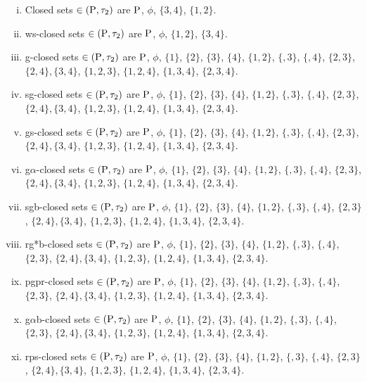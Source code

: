 \begin{exm}
\begin{enumerate}[(i)]
\item Closed sets $\in(\mathrm{P}, \tau_{2})$ are $\mathrm{P}$, $\phi$, $\{3, 4\}$, $\{1, 2\}$.
\item ws-closed sets $\in(\mathrm{P}, \tau_{2})$ are $\mathrm{P}$, $\phi$, $\{1, 2\}$, $\{3, 4\}$.
\item g-closed sets $\in(\mathrm{P}, \tau_{2})$ are $\mathrm{P}$, $\phi$, $\{1\}$, $\{2\}$, $\{3\}$, $\{4\}$, $\{1, 2\}$, $\{, 3\}$, $\{, 4\}$, $\{2, 3\}$, $\{2, 4\}, \{3, 4\}$, $\{1, 2, 3\}$, $\{1, 2, 4\}$, $\{1, 3, 4\}$, $\{2, 3, 4\}$.
\item sg-closed sets $\in(\mathrm{P}, \tau_{2})$ are $\mathrm{P}$, $\phi$, $\{1\}$, $\{2\}$, $\{3\}$, $\{4\}$, $\{1, 2\}$, $\{, 3\}$, $\{, 4\}$, $\{2, 3\}$, $\{2, 4\}, \{3, 4\}$, $\{1, 2, 3\}$, $\{1, 2, 4\}$, $\{1, 3, 4\}$, $\{2, 3, 4\}$.
\item gs-closed sets $\in(\mathrm{P}, \tau_{2})$ are $\mathrm{P}$, $\phi$, $\{1\}$, $\{2\}$, $\{3\}$, $\{4\}$, $\{1, 2\}$, $\{, 3\}$, $\{, 4\}$, $\{2, 3\}$, $\{2, 4\}, \{3, 4\}$, $\{1, 2, 3\}$, $\{1, 2, 4\}$, $\{1, 3, 4\}$, $\{2, 3, 4\}$.
\item g$\alpha$-closed sets $\in(\mathrm{P}, \tau_{2})$ are $\mathrm{P}$, $\phi$, $\{1\}$, $\{2\}$, $\{3\}$, $\{4\}$, $\{1, 2\}$, $\{, 3\}$, $\{, 4\}$, $\{2, 3\}$, $\{2, 4\}, \{3, 4\}$, $\{1, 2, 3\}$, $\{1, 2, 4\}$, $\{1, 3, 4\}$, $\{2, 3, 4\}$.
\item sgb-closed sets $\in(\mathrm{P}, \tau_{2})$ are $\mathrm{P}$, $\phi$, $\{1\}$, $\{2\}$, $\{3\}$, $\{4\}$, $\{1, 2\}$, $\{, 3\}$, $\{, 4\}$, $\{2, 3\}$, $\{2, 4\}, \{3, 4\}$, $\{1, 2, 3\}$, $\{1, 2, 4\}$, $\{1, 3, 4\}$, $\{2, 3, 4\}$.
\item rg*b-closed sets $\in(\mathrm{P}, \tau_{2})$ are $\mathrm{P}$, $\phi$, $\{1\}$, $\{2\}$, $\{3\}$, $\{4\}$, $\{1, 2\}$, $\{, 3\}$, $\{, 4\}$, $\{2, 3\}$, $\{2, 4\}, \{3, 4\}$, $\{1, 2, 3\}$, $\{1, 2, 4\}$, $\{1, 3, 4\}$, $\{2, 3, 4\}$.
\item pgpr-closed sets $\in(\mathrm{P}, \tau_{2})$ are $\mathrm{P}$, $\phi$, $\{1\}$, $\{2\}$, $\{3\}$, $\{4\}$, $\{1, 2\}$, $\{, 3\}$, $\{, 4\}$, $\{2, 3\}$, $\{2, 4\}, \{3, 4\}$, $\{1, 2, 3\}$, $\{1, 2, 4\}$, $\{1, 3, 4\}$, $\{2, 3, 4\}$.
\item g$\alpha$b-closed sets $\in(\mathrm{P}, \tau_{2})$ are $\mathrm{P}$, $\phi$, $\{1\}$, $\{2\}$, $\{3\}$, $\{4\}$, $\{1, 2\}$, $\{, 3\}$, $\{, 4\}$, $\{2, 3\}$, $\{2, 4\}, \{3, 4\}$, $\{1, 2, 3\}$, $\{1, 2, 4\}$, $\{1, 3, 4\}$, $\{2, 3, 4\}$.
\item rps-closed sets $\in(\mathrm{P}, \tau_{2})$ are $\mathrm{P}$, $\phi$, $\{1\}$, $\{2\}$, $\{3\}$, $\{4\}$, $\{1, 2\}$, $\{, 3\}$, $\{, 4\}$, $\{2, 3\}$, $\{2, 4\}, \{3, 4\}$, $\{1, 2, 3\}$, $\{1, 2, 4\}$, $\{1, 3, 4\}$, $\{2, 3, 4\}$.
\end{enumerate}


\end{exm}
